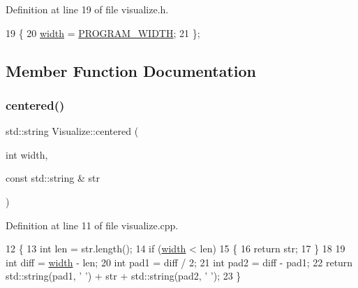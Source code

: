 Definition at line 19 of file visualize.\+h.


\begin{DoxyCode}
19                    \{
20             \hyperlink{class_visualize_af5ac723ad5f8fe8c4a8378bf1299cda7}{width} = \hyperlink{utilities_8h_a5ee336838879920d67d1f9c59217dbe0}{PROGRAM\_WIDTH};
21         \};
\end{DoxyCode}


\subsection{Member Function Documentation}
\mbox{\label{class_visualize_a9d34d81d684587b8b2b8bf70031f1670}} 
\subsubsection{\texorpdfstring{centered()}{centered()}}
{\footnotesize\ttfamily std\+::string Visualize\+::centered (\begin{DoxyParamCaption}\item[{int}]{width,  }\item[{const std\+::string \&}]{str }\end{DoxyParamCaption})}



Definition at line 11 of file visualize.\+cpp.


\begin{DoxyCode}
12 \{
13     \textcolor{keywordtype}{int} len = str.length();
14     \textcolor{keywordflow}{if} (\hyperlink{class_visualize_af5ac723ad5f8fe8c4a8378bf1299cda7}{width} < len)
15     \{
16         \textcolor{keywordflow}{return} str;
17     \}
18 
19     \textcolor{keywordtype}{int} diff = \hyperlink{class_visualize_af5ac723ad5f8fe8c4a8378bf1299cda7}{width} - len;
20     \textcolor{keywordtype}{int} pad1 = diff / 2;
21     \textcolor{keywordtype}{int} pad2 = diff - pad1;
22     \textcolor{keywordflow}{return} std::string(pad1, \textcolor{charliteral}{' '}) + str + std::string(pad2, \textcolor{charliteral}{' '});
23 \}
\end{DoxyCode}
\mbox{\label{class_visualize_a52a0dfaf625bd3ac294a00e3161094cf}} 
